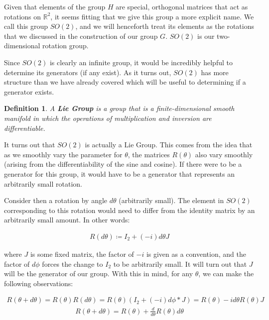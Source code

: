 \documentclass[10pt]{ucthesis}
\newcommand{\R}{\mathbb{R}}
\newtheorem{definition}{Definition}[chapter]
\begin{document}
Given that elements of the group $H$ are special, orthogonal matrices that act as rotations on $\R^2$, it seems fitting that we give this group a more explicit name. We call this group $SO(2)$, and we will henceforth treat its elements as the rotations that we discussed in the construction of our group $G$. $SO(2)$ is our two-dimensional rotation group.

Since $SO(2)$ is clearly an infinite group, it would be incredibly helpful to determine its generators (if any exist). As it turns out, $SO(2)$ has more structure than we have already covered which will be useful to determining if a generator exists.

\begin{definition}
	A \textbf{Lie Group} is a group that is a finite-dimensional smooth manifold in which the operations of multiplication and inversion are differentiable.
\end{definition}

It turns out that $SO(2)$ is actually a Lie Group. This comes from the idea that as we smoothly vary the parameter for $\theta$, the matrices $R(\theta)$ also vary smoothly (arising from the differentiability of the sine and cosine). If there were to be a generator for this group, it would have to be a generator that represents an arbitrarily small rotation.

Consider then a rotation by angle $d\theta$ (arbitrarily small). The element in $SO(2)$ corresponding to this rotation would need to differ from the identity matrix by an arbitrarily small amount. In other words:

\begin{equation}
	\begin{aligned}
		R(d\theta) \coloneq I_2 + (-i)d\theta  J
	\end{aligned}
\end{equation}  

\noindent where $J$ is some fixed matrix, the factor of $-i$ is given as a convention, and the factor of $d\phi$ forces the change to $I_2$ to be arbitrarily small. It will turn out that $J$ will be the generator of our group. With this in mind, for any $\theta$, we can make the following observations:

\begin{equation}
	\begin{aligned}
		R(\theta + d\theta) = R(\theta)R(d\theta) = R(\theta)\left(I_2 + (-i)d\phi * J\right) = R(\theta) - id\theta R(\theta)J
	\end{aligned}
\end{equation}  
\begin{equation}
	\begin{aligned}
		R(\theta + d\theta) = R(\theta) + \frac{d}{d\theta}R(\theta)d\theta
	\end{aligned}
\end{equation}  
\end{document}
